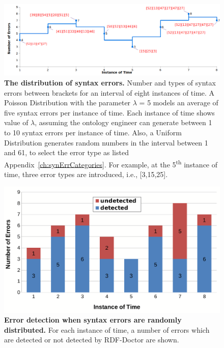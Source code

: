 \begin{figure}[ht]
	\begin{center}
		\includegraphics[scale=0.45,angle=0]{images/Experiment02-01.png}
		\setlength\belowcaptionskip{-5mm}
		\caption{\textbf{The distribution of syntax errors.} Number and types of syntax errors between brackets for an interval of eight instances of time. 
		A Poisson Distribution with the parameter $\lambda$ = 5 models an average of five syntax errors per instance of time. 
		Each instance of time shows value of $\lambda$, assuming the ontology engineer can generate between 1 to 10 syntax errors per instance of time. 
		Also, a Uniform Distribution generates random numbers in the interval between 1 and 61, to select the error type as listed Appendix~\ref{ch:synErrCategories}. 
		For example, at the 5\textsuperscript{th} instance of time, three error types are introduced, i.e., [3,15,25].} 
		\label{Fig:experiment2}
	\end{center}
\end{figure}


	\begin{figure}[ht]
	\begin{center}
		\includegraphics[scale=0.3,angle=0]{images/Experiment02-02.png}
		\setlength\belowcaptionskip{-5mm}
		\caption{\textbf{Error detection when syntax errors are randomly distributed.} 
		For each instance of time, a number of errors which are detected or not detected by RDF-Doctor are shown.
		} 
		\label{Fig:Experiment02-02}
	\end{center}
\end{figure}


